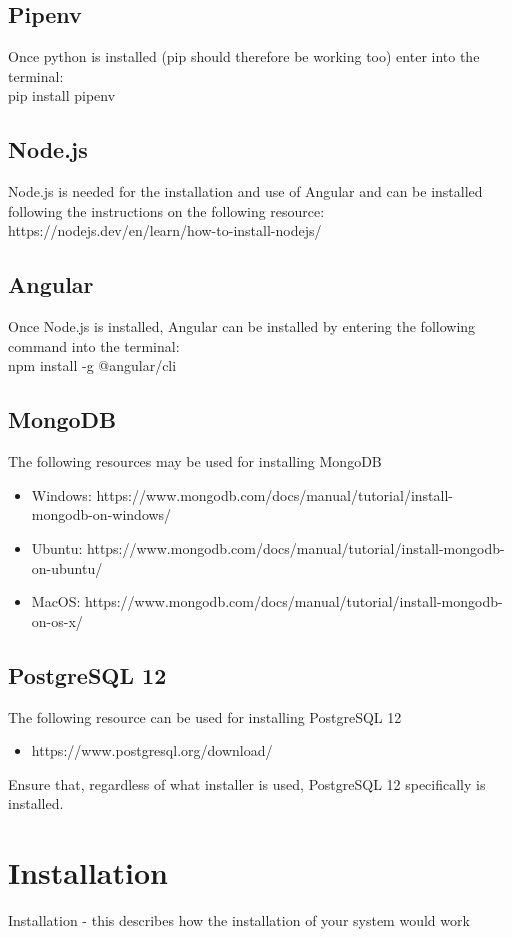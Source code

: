 \documentclass{article}
\begin{document}
\subsection{Pipenv}
Once python is installed (pip should therefore be working too) enter into the terminal:\\
pip install pipenv

\subsection{Node.js}
Node.js is needed for the installation and use of Angular and can be installed
following the instructions on the following resource:\\
https://nodejs.dev/en/learn/how-to-install-nodejs/

\subsection{Angular}
Once Node.js is installed, Angular can be installed by entering the following command into the terminal:\\
npm install -g @angular/cli

\subsection{MongoDB}
The following resources may be used for installing MongoDB
\begin{itemize}
    \item Windows: https://www.mongodb.com/docs/manual/tutorial/install-mongodb-on-windows/
    \item Ubuntu: https://www.mongodb.com/docs/manual/tutorial/install-mongodb-on-ubuntu/
    \item MacOS: https://www.mongodb.com/docs/manual/tutorial/install-mongodb-on-os-x/
\end{itemize}

\subsection{PostgreSQL 12}
The following resource can be used for installing PostgreSQL 12
\begin{itemize}
    \item https://www.postgresql.org/download/
\end{itemize}
Ensure that, regardless of what installer is used, PostgreSQL 12 specifically is installed.


\section{Installation}
Installation - this describes how the installation of your system would work
\end{document}
